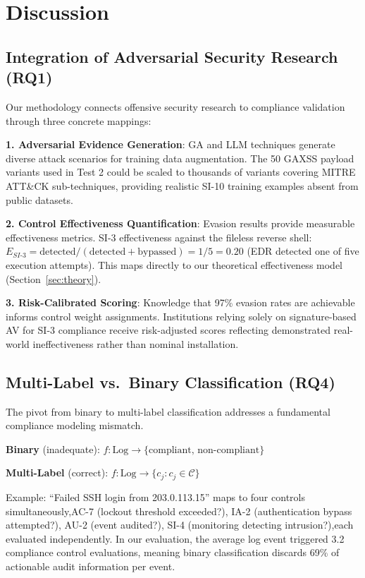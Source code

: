 \documentclass[futureinternet,article,submit,pdftex,moreauthors]{Definitions/mdpi}
\begin{document}
\section{Discussion}
\label{sec:discussion}

\subsection{Integration of Adversarial Security Research (RQ1)}

Our methodology connects offensive security research to compliance validation through three
concrete mappings:

\textbf{1. Adversarial Evidence Generation}: GA and LLM techniques generate diverse attack
scenarios for training data augmentation. The 50 GAXSS payload variants used in Test 2 could
be scaled to thousands of variants covering MITRE ATT\&CK sub-techniques, providing realistic
SI-10 training examples absent from public datasets.

\textbf{2. Control Effectiveness Quantification}: Evasion results provide measurable
effectiveness metrics. SI-3 effectiveness against the fileless reverse shell:
$E_{SI\text{-}3} = \text{detected} / (\text{detected} + \text{bypassed}) = 1/5 = 0.20$
(EDR detected one of five execution attempts). This maps directly to our theoretical
effectiveness model (Section~\ref{sec:theory}).

\textbf{3. Risk-Calibrated Scoring}: Knowledge that 97\% evasion rates are
achievable~\cite{reverse_shell_paper} informs control weight assignments. Institutions relying
solely on signature-based AV for SI-3 compliance receive risk-adjusted scores reflecting
demonstrated real-world ineffectiveness rather than nominal installation.

\subsection{Multi-Label vs.\ Binary Classification (RQ4)}

The pivot from binary to multi-label classification addresses a fundamental compliance modeling
mismatch.

\textbf{Binary} (inadequate): $f\colon \text{Log} \to \{\text{compliant},\, \text{non-compliant}\}$

\textbf{Multi-Label} (correct): $f\colon \text{Log} \to \{c_j : c_j \in \mathcal{C}\}$

Example: ``Failed SSH login from 203.0.113.15'' maps to four controls
simultaneously,AC-7 (lockout threshold exceeded?), IA-2 (authentication bypass attempted?),
AU-2 (event audited?), SI-4 (monitoring detecting intrusion?),each evaluated independently.
In our evaluation, the average log event triggered 3.2 compliance control evaluations, meaning
binary classification discards 69\% of actionable audit information per event.
\end{document}
